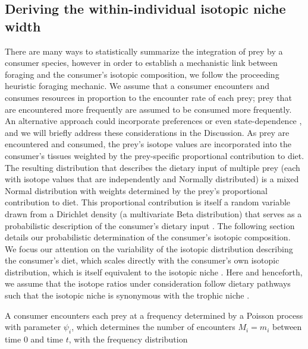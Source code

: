\documentclass{article}
\begin{document}
\subsection*{Deriving the within-individual isotopic niche width}
There are many ways to statistically summarize the integration of prey by a consumer species, however in order to establish a mechanistic link between foraging and the consumer's isotopic composition, we follow the proceeding heuristic foraging mechanic.
We assume that a consumer encounters and consumes resources in proportion to the encounter rate of each prey; prey that are encountered more frequently are assumed to be consumed more frequently.
An alternative approach could incorporate preferences \citep{Chesson:1983bt} or even state-dependence \citep{Mangel:1988uaa,Clark:2000tra,Mangel:2014kz}, and we will briefly address these considerations in the Discussion.
As prey are encountered and consumed, the prey's isotope values are incorporated into the consumer's tissues weighted by the prey-specific proportional contribution to diet.
The resulting distribution that describes the dietary input of multiple prey (each with  isotope values that are independently and Normally distributed) is a mixed Normal distribution with weights determined by the prey's proportional contribution to diet.
This proportional contribution is itself a random variable drawn from a Dirichlet density (a multivariate Beta distribution) that serves as a probabilistic description of the consumer's dietary input \citep{Ainsworth:2010uo}.
The following section details our probabilistic determination of the consumer's isotopic composition.
We focus our attention on the variability of the isotopic distribution describing the consumer's diet, which scales directly with the consumer's own isotopic distribution, which is itself equivalent to the isotopic niche \citep{Bearhop:2004im,Newsome:2007tz}.
Here and henceforth, we assume that the isotope ratios under consideration follow dietary pathways such that the isotopic niche is synonymous with the trophic niche \citep{Bearhop:2004im}.


A consumer encounters each prey at a frequency determined by a Poisson process with parameter $\psi_i$, which determines the number of encounters $M_i=m_i$ between time 0 and time $t$, with the frequency distribution
\end{document}
